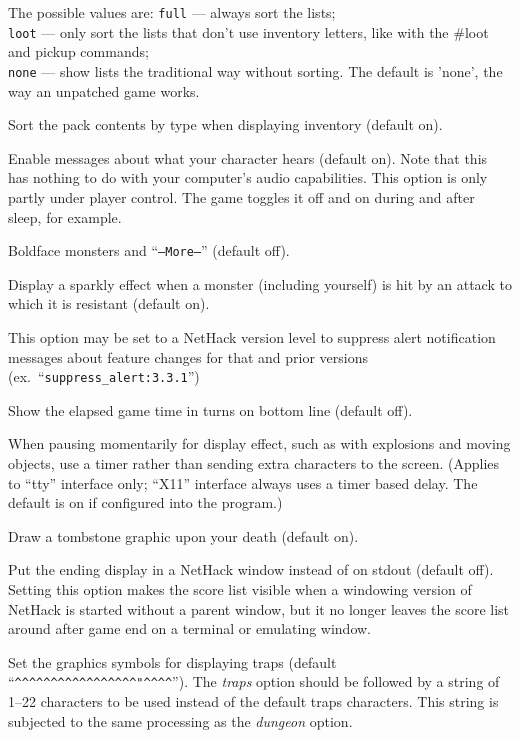 The possible values are:
{\tt full} --- always sort the lists;\\
{\tt loot} --- only sort the lists that don't use inventory
       letters, like with the \#loot and pickup commands;\\
{\tt none} --- show lists the traditional way without sorting.
The default is 'none', the way an unpatched game works.
\item[\ib{sortpack}]
Sort the pack contents by type when displaying inventory (default on).
\item[\ib{sound}]
Enable messages about what your character hears (default on).
Note that this has nothing to do with your computer's audio capabilities.
This option is only partly under player control.  The game toggles it
off and on during and after sleep, for example.
\item[\ib{standout}]
Boldface monsters and ``{\tt --More--}'' (default off).
\item[\ib{sparkle}]
Display a sparkly effect when a monster (including yourself) is hit by an
attack to which it is resistant (default on).
\item[\ib{suppress\_alert}]
This option may be set to a NetHack version level to suppress
alert notification messages about feature changes for that 
and prior versions (ex.\ ``{\tt suppress\_alert:3.3.1}'')
\item[\ib{time}]
Show the elapsed game time in turns on bottom line (default off).
\item[\ib{timed\_delay}]
When pausing momentarily for display effect, such as with explosions and
moving objects, use a timer rather than sending extra characters to the
screen.  (Applies to ``tty'' interface only; ``X11'' interface always
uses a timer based delay.  The default is on if configured into the
program.)
\item[\ib{tombstone}]
Draw a tombstone graphic upon your death (default on).
\item[\ib{toptenwin}]
Put the ending display in a NetHack window instead of on stdout (default off).
Setting this option makes the score list visible when a windowing version
of NetHack is started without a parent window, but it no longer leaves
the score list around after game end on a terminal or emulating window.
\item[\ib{traps}]
Set the graphics symbols for displaying traps (default
``\verb&^^^^^^^^^^^^^^^^^"^^^^&'').
The {\it traps\/} option should be followed by a string of 1--22
characters to be used instead of the default traps characters.
This string is subjected to the same processing as the {\it dungeon\/} option.


